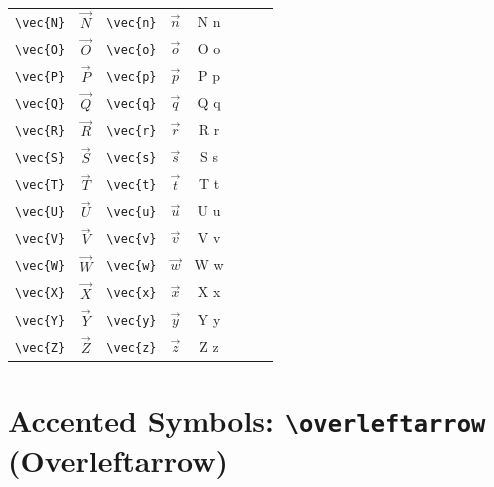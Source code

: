 \documentclass[12pt,a4paper]{article}
\begin{document}
\begin{longtable}{|l|c|l|c|c|l|c|c|}
\verb|\vec{N}| & $\vec{N}$       & \verb|\vec{n}| & $\vec{n}$       & N⃗ n⃗            &                 &                 & \\
\verb|\vec{O}| & $\vec{O}$       & \verb|\vec{o}| & $\vec{o}$       & O⃗ o⃗            &                 &                 & \\
\verb|\vec{P}| & $\vec{P}$       & \verb|\vec{p}| & $\vec{p}$       & P⃗ p⃗            &                 &                 & \\
\verb|\vec{Q}| & $\vec{Q}$       & \verb|\vec{q}| & $\vec{q}$       & Q⃗ q⃗            &                 &                 & \\
\verb|\vec{R}| & $\vec{R}$       & \verb|\vec{r}| & $\vec{r}$       & R⃗ r⃗            &                 &                 & \\
\verb|\vec{S}| & $\vec{S}$       & \verb|\vec{s}| & $\vec{s}$       & S⃗ s⃗            &                 &                 & \\
\verb|\vec{T}| & $\vec{T}$       & \verb|\vec{t}| & $\vec{t}$       & T⃗ t⃗            &                 &                 & \\
\verb|\vec{U}| & $\vec{U}$       & \verb|\vec{u}| & $\vec{u}$       & U⃗ u⃗            &                 &                 & \\
\verb|\vec{V}| & $\vec{V}$       & \verb|\vec{v}| & $\vec{v}$       & V⃗ v⃗            &                 &                 & \\
\verb|\vec{W}| & $\vec{W}$       & \verb|\vec{w}| & $\vec{w}$       & W⃗ w⃗            &                 &                 & \\
\verb|\vec{X}| & $\vec{X}$       & \verb|\vec{x}| & $\vec{x}$       & X⃗ x⃗            &                 &                 & \\
\verb|\vec{Y}| & $\vec{Y}$       & \verb|\vec{y}| & $\vec{y}$       & Y⃗ y⃗            &                 &                 & \\
\verb|\vec{Z}| & $\vec{Z}$       & \verb|\vec{z}| & $\vec{z}$       & Z⃗ z⃗            &                 &                 & \\
\hline
\end{longtable}

\newpage

\section*{Accented Symbols: \texttt{\textbackslash overleftarrow} (Overleftarrow)}
\end{document}
